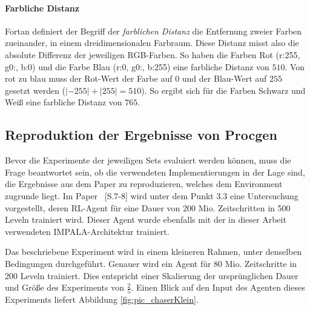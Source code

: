 \paragraph{Farbliche Distanz}\label{farblicheDistanz}
Fortan definiert der Begriff der \emph{farblichen Distanz} die Entfernung zweier Farben zueinander, in einem dreidimensionalen Farbraum. Diese Distanz misst also die absolute Differenz der jeweiligen RGB-Farben. So haben die Farben Rot (r:255, g0:, b:0) und die Farbe Blau (r:0, g0:, b:255) eine farbliche Distanz von $510$. Von rot zu blau muss der Rot-Wert der Farbe auf $0$ und der Blau-Wert auf $255$ gesetzt werden ($|-255| + |255| = 510$). So ergibt sich für die Farben Schwarz und Weiß eine farbliche Distanz von $765$.

\subsection{Reproduktion der Ergebnisse von Procgen}\label{sec:absch_EXP_durch_reproduktion}
Bevor die Experimente der jeweiligen Sets evaluiert werden können, muss die Frage beantwortet sein, ob die verwendeten Implementierungen in der Lage sind, die Ergebnisse aus dem Paper zu reproduzieren, welches dem Environment zugrunde liegt. Im Paper \cite{cobbe2019procgen}~[S.7-8] wird unter dem Punkt 3.3 eine Untersuchung vorgestellt, deren RL-Agent für eine Dauer von 200 Mio. Zeitschritten in 500 Leveln trainiert wird. Dieser Agent wurde ebenfalls mit der in dieser Arbeit verwendeten IMPALA-Architektur \cite{espeholt2018impala} trainiert. 

Das beschriebene Experiment wird in einem kleineren Rahmen, unter denselben Bedingungen durchgeführt. Genauer wird ein Agent für 80 Mio. Zeitschritte in 200 Leveln trainiert. Dies entspricht einer Skalierung der ursprünglichen Dauer und Größe des Experiments von $\frac{2}{5}$. Einen Blick auf den Input des Agenten dieses Experiments liefert Abbildung \ref{fig:pic_chaserKlein}.


